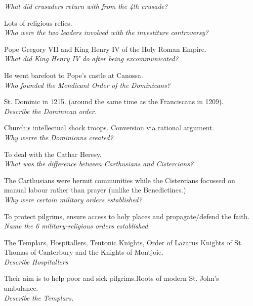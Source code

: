 \documentclass[12pt]{article}
\begin{document}
\textit{What did crusaders return with from the 4th crusade?}

Lots of religious relics.\\

\textit{Who were the two leaders involved with the investiture controversy?}

Pope Gregory VII and King Henry IV of the Holy Roman Empire.\\

\textit{What did King Henry IV do after being excommunicated?}

He went barefoot to Pope's castle at Canossa.\\

\textit{Who founded the Mendicant Order of the Dominicans?}

St. Dominic in 1215. (around the same time as the Franciscans in 1209).\\

\textit{Describe the Dominican order}.

Church;s intellectual shock troops. Conversion via rational argument.\\

\textit{Why werre the Dominicans created?}

To deal with the Cathar Heresy.\\

\textit{What was the difference between Carthusians and Cistercians?}

The Carthusians were hermit communities while the Cistercians focussed on manual labour rather than prayer (unlike the Benedictines.)\\

\textit{Why were certain military orders established?}

To protect pilgrims, ensure access to holy places and propagate/defend the faith.\\

\textit{Name the 6 military-religious orders established}

The Templars, Hospitallers, Teutonic Knights, Order of Lazarus Knights of St. Thomas of Canterbury and the Knights of Montjoie.\\

\textit{Describe Hospitallers}

Their aim is to help poor and sick pilgrims.Roots of modern St. John's ambulance.\\

\textit{Describe the Templars.}
\end{document}
